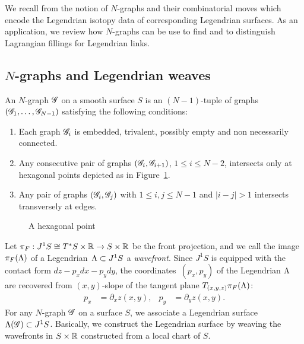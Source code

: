 
We recall from \cite{CZ2020} the notion of $N$-graphs and their combinatorial moves which encode the Legendrian isotopy data of corresponding Legendrian surfaces. As an application, we review how $N$-graphs can be use to find and to distinguish Lagrangian fillings for Legendrian links.

\subsection{\texorpdfstring{$N$}{N}-graphs and Legendrian weaves}

\begin{definition}\cite[Definition~2.2]{CZ2020}\label{definition:N-graph}
An  $N$-graph $\mathscr{G}$ on a smooth surface $S$ is an $(N-1)$-tuple of graphs $(\mathscr{G}_1,\dots, \mathscr{G}_{N-1})$ satisfying the following conditions:
\begin{enumerate}
\item Each graph $\mathscr{G}_i$ is embedded, trivalent, possibly empty and non necessarily connected.
\item Any consecutive pair of graphs $(\mathscr{G}_i,\mathscr{G}_{i+1})$, $1\leq i \leq N-2$, intersects only at hexagonal points depicted as in Figure~\ref{fig:hexagonal_point}.
\item Any pair of graphs $(\mathscr{G}_i, \mathscr{G}_j)$ with $1\leq i,j\leq N-1$ and $|i-j|>1$  intersects transversely at edges.
\end{enumerate}
\end{definition}

\begin{figure}[ht]
\caption{A hexagonal point}
\label{fig:hexagonal_point}
\end{figure}


Let $\pi_F:J^1S \cong T^*S\times\mathbb{R}\to S\times \mathbb{R}$ be the front projection, and we call the image $\pi_F(\Lambda)$ of a Legendrian~$\Lambda\subset J^1S$ a \emph{wavefront}.
Since $J^1S$ is equipped with the contact form $dz-p_x dx-p_y dy$, the coordinates~$(p_x,p_y)$ of the Legendrian $\Lambda$ are recovered from $(x,y)$-slope of the tangent plane $T_{(x,y,z)}\pi_F(\Lambda)$:
\begin{align*}
p_x&=\partial_x z(x,y),&  p_y&=\partial_y z(x,y).
\end{align*}
For any $N$-graph $\mathscr{G}$ on a surface $S$, we associate a Legendrian surface $\Lambda(\mathscr{G})\subset J^1S$. 
Basically, we construct the Legendrian surface by weaving the wavefronts in $S \times \mathbb{R}$ constructed from a local chart of $S$. 

